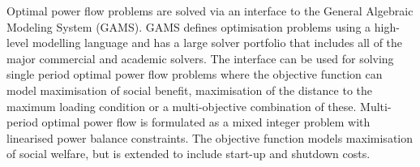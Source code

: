 
Optimal power flow problems are solved via an interface to the General Algebraic
Modeling System (GAMS).  GAMS defines optimisation problems using a high-level
modelling language and has a large solver portfolio that includes all of the
major commercial and academic solvers.  The interface can be used for solving single
period optimal power flow problems where the objective function can model
maximisation of social benefit, maximisation of the distance to the maximum
loading condition or a multi-objective combination of these. Multi-period
optimal power flow is formulated as a mixed integer problem with linearised
power balance constraints.  The objective function models maximisation of social
welfare, but is extended to include start-up and shutdown costs.


